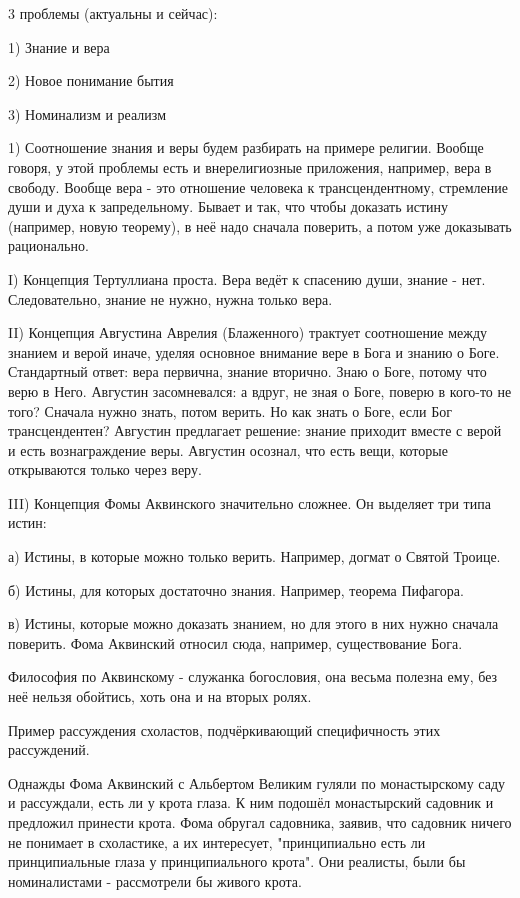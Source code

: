 \documentclass[a4paper, 12pt]{article}
\begin{document}
3 проблемы (актуальны и сейчас):

1)	Знание и вера

2)	Новое понимание бытия

3)	Номинализм и реализм


1) Соотношение знания и веры будем разбирать на примере религии. Вообще говоря, у этой проблемы есть и внерелигиозные приложения, например, вера в свободу. Вообще вера - это отношение человека к трансцендентному, стремление души и духа к запредельному. Бывает и так, что чтобы доказать истину (например, новую теорему), в неё надо сначала поверить, а потом уже доказывать рационально.

I)	Концепция Тертуллиана проста. Вера ведёт к спасению души, знание - нет. Следовательно, знание не нужно, нужна только вера.

II)	Концепция Августина Аврелия (Блаженного) трактует соотношение между знанием и верой иначе, уделяя основное внимание вере в Бога и знанию о Боге. Стандартный ответ: вера первична, знание вторично. Знаю о Боге, потому что верю в Него. Августин засомневался: а вдруг, не зная о Боге, поверю в кого-то не того? Сначала нужно знать, потом верить. Но как знать о Боге, если Бог трансцендентен? Августин предлагает решение: знание приходит вместе с верой и есть вознаграждение веры. Августин осознал, что есть вещи, которые открываются только через веру.

III)	Концепция Фомы Аквинского значительно сложнее. Он выделяет три типа истин:

а) Истины, в которые можно только верить. Например, догмат о Святой Троице.

б) Истины, для которых достаточно знания. Например, теорема Пифагора.

в) Истины, которые можно доказать знанием, но для этого в них нужно сначала поверить. Фома Аквинский относил сюда, например, существование Бога.

Философия по Аквинскому - служанка богословия, она весьма полезна ему, без неё нельзя обойтись, хоть она и на вторых ролях.

Пример рассуждения схоластов, подчёркивающий специфичность этих рассуждений.

Однажды Фома Аквинский с Альбертом Великим гуляли по монастырскому саду и рассуждали, есть ли у крота глаза. К ним подошёл монастырский садовник и предложил принести крота. Фома обругал садовника, заявив, что садовник ничего не понимает в схоластике, а их интересует, "принципиально есть ли принципиальные глаза у принципиального крота". Они реалисты, были бы номиналистами - рассмотрели бы живого крота.
\end{document}
